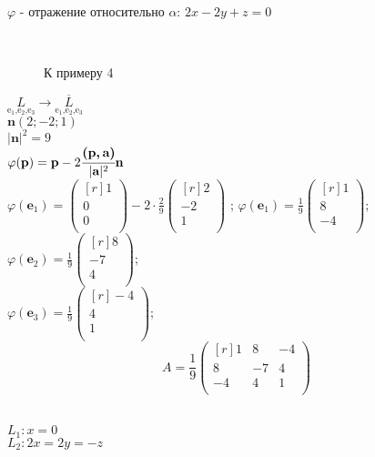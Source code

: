 \begin{prim}
$\varphi$ - отражение относительно $\alpha$: $2x-2y+z=0$
\end{prim}\\

\begin{wrapfigure}{r}{0.35\linewidth}
	\vspace{-2.5cm}
	\def\svgwidth{6cm} %
	
	\caption{К примеру 4}
	\label{...}
	\vspace{-9cm}
\end{wrapfigure}

$\underset{\text{e$_1$,e$_2$,e$_3$}}{L}\rightarrow\underset{\text{e$_1$,e$_2$,e$_3$}}{\overline{L}}$\\
$\textbf{n} (2;-2;1)$\\
$|\textbf{n}|^2=9$\\
$\varphi(\textbf{p})=\textbf{p}-2\cfrac{\textbf{(p,\,a)}}{|\textbf{a}|^2}\textbf{n}$\\
$\varphi(\textbf{e$_1$})=
\left(
\begin{smallmatrix*}[r]
 1\\ 0\\ 0\\
\end{smallmatrix*}
\right)
-2 \cdot \frac{2}{9} 
\left(
\begin{smallmatrix*}[r]
 2\\ -2\\ 1\\
\end{smallmatrix*}
\right)$
;
$\varphi(\textbf{e$_1$})=\frac{1}{9} 
\left(
\begin{smallmatrix*}[r]
 1\\ 8\\ -4\\
\end{smallmatrix*}
\right)$;\\
$\varphi(\textbf{e$_2$})=\frac{1}{9} 
\left(
\begin{smallmatrix*}[r]
 8\\ -7\\ 4\\
\end{smallmatrix*}
\right)$;\\
$\varphi(\textbf{e$_3$})=\frac{1}{9} 
\left(
\begin{smallmatrix*}[r]
 -4\\ 4\\ 1\\
\end{smallmatrix*}
\right)$;\\
$$
A=\frac{1}{9} 
\begin{pmatrix*}[r]
 1 & 8 & -4\\
 8 & -7 & 4\\
 -4 & 4 & 1\\
\end{pmatrix*}
$$\\
\begin{prim}
$L_1: x=0$\\
$L_2: 2x=2y=-z$\\
\end{prim}\\

